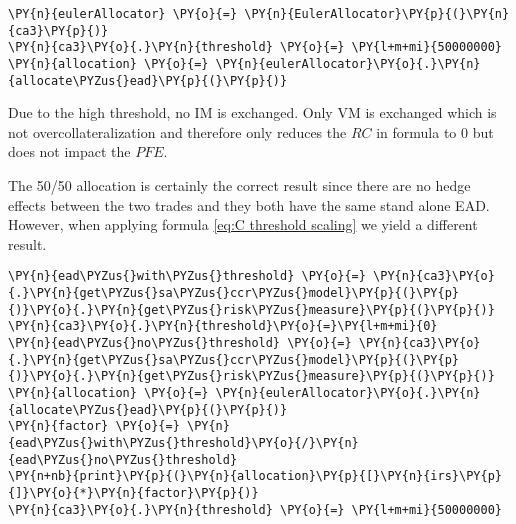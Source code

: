     \begin{tcolorbox}[breakable, size=fbox, boxrule=1pt, pad at break*=1mm,colback=cellbackground, colframe=cellborder]
\begin{Verbatim}[commandchars=\\\{\}]
\PY{n}{eulerAllocator} \PY{o}{=} \PY{n}{EulerAllocator}\PY{p}{(}\PY{n}{ca3}\PY{p}{)}
\PY{n}{ca3}\PY{o}{.}\PY{n}{threshold} \PY{o}{=} \PY{l+m+mi}{50000000}
\PY{n}{allocation} \PY{o}{=} \PY{n}{eulerAllocator}\PY{o}{.}\PY{n}{allocate\PYZus{}ead}\PY{p}{(}\PY{p}{)}
\end{Verbatim}
\end{tcolorbox}

    Due to the high threshold, no IM is exchanged. Only VM is exchanged
which is not overcollateralization and therefore only reduces the \(RC\)
in formula  to 0 but does not impact the
\(PFE\).

    The 50/50 allocation is certainly the correct result since there are no
hedge effects between the two trades and they both have the same stand
alone EAD. However, when applying formula \ref{eq:C threshold scaling}
we yield a different result.

    \begin{tcolorbox}[breakable, size=fbox, boxrule=1pt, pad at break*=1mm,colback=cellbackground, colframe=cellborder]
\begin{Verbatim}[commandchars=\\\{\}]
\PY{n}{ead\PYZus{}with\PYZus{}threshold} \PY{o}{=} \PY{n}{ca3}\PY{o}{.}\PY{n}{get\PYZus{}sa\PYZus{}ccr\PYZus{}model}\PY{p}{(}\PY{p}{)}\PY{o}{.}\PY{n}{get\PYZus{}risk\PYZus{}measure}\PY{p}{(}\PY{p}{)}
\PY{n}{ca3}\PY{o}{.}\PY{n}{threshold}\PY{o}{=}\PY{l+m+mi}{0}
\PY{n}{ead\PYZus{}no\PYZus{}threshold} \PY{o}{=} \PY{n}{ca3}\PY{o}{.}\PY{n}{get\PYZus{}sa\PYZus{}ccr\PYZus{}model}\PY{p}{(}\PY{p}{)}\PY{o}{.}\PY{n}{get\PYZus{}risk\PYZus{}measure}\PY{p}{(}\PY{p}{)}
\PY{n}{allocation} \PY{o}{=} \PY{n}{eulerAllocator}\PY{o}{.}\PY{n}{allocate\PYZus{}ead}\PY{p}{(}\PY{p}{)}
\PY{n}{factor} \PY{o}{=} \PY{n}{ead\PYZus{}with\PYZus{}threshold}\PY{o}{/}\PY{n}{ead\PYZus{}no\PYZus{}threshold}
\PY{n+nb}{print}\PY{p}{(}\PY{n}{allocation}\PY{p}{[}\PY{n}{irs}\PY{p}{]}\PY{o}{*}\PY{n}{factor}\PY{p}{)}
\PY{n}{ca3}\PY{o}{.}\PY{n}{threshold} \PY{o}{=} \PY{l+m+mi}{50000000}
\end{Verbatim}
\end{tcolorbox}


